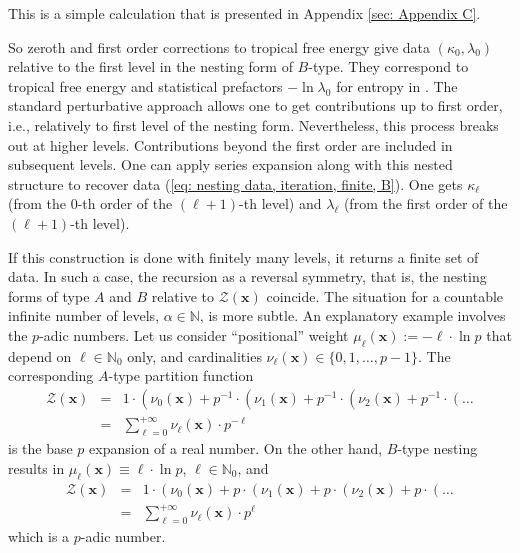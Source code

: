 \documentclass[11pt,british,reqno]{article}
\makeatletter
\numberwithin{equation}{section}
\numberwithin{figure}{section}
\numberwithin{table}{section}
\theoremstyle{definition}
\theoremstyle{definition}
\theoremstyle{plain}
\theoremstyle{plain}
\theoremstyle{remark}
\theoremstyle{plain}
\numberwithin{equation}{section}
\numberwithin{figure}{section}
\numberwithin{table}{section}
\theoremstyle{plain}
\renewenvironment{proof}[1][\proofname]{\par
  \pushQED{\qed}%
  \normalfont \topsep6\p@\@plus6\p@\relax
  \list{}{%
    \settowidth{\leftmargin}{\itshape\proofname:\hskip\labelsep}%
    \setlength{\labelwidth}{0pt}%
    \setlength{\itemindent}{-\leftmargin}%
  }%
  \item[\hskip\labelsep\itshape#1\@addpunct{:}]\ignorespaces
}{%
  \popQED\endlist\@endpefalse
}
\makeatother
\begin{document}
\begin{proof} This is a simple calculation that is presented in Appendix \ref{sec: Appendix C}. 
\end{proof}

So zeroth and first order corrections to tropical free energy give
data $(\kappa_{0},\lambda_{0})$ relative to the first level in the
nesting form of $B$-type. They correspond to tropical free energy
and statistical prefactors $-\ln\lambda_{0}$ for entropy in \cite{AK2015}.
The standard perturbative approach allows one to get contributions
up to first order, i.e., relatively to first level of the nesting form. Nevertheless,
this process breaks out at higher levels. Contributions beyond the
first order are included in subsequent levels. One can apply series
expansion along with this nested structure to recover data (\ref{eq: nesting data, iteration, finite, B}). One
gets $\kappa_{\ell}$ (from the $0$-th order of the $(\ell+1)$-th
level) and $\lambda_{\ell}$ (from the first order of the $(\ell+1)$-th
level). 

If this construction is done with finitely many levels, it returns
a finite set of data. In such a case, the recursion as a reversal
symmetry, that is, the nesting forms of type $A$ and $B$ relative
to $\mathcal{Z}(\boldsymbol{x})$ coincide. The situation for a countable
infinite number of levels, $\alpha\in\mathbb{N}$, is more subtle.
An explanatory example involves the $p$-adic numbers. Let us consider
``positional'' weight $\mu_{\ell}(\boldsymbol{x}):=-\ell\cdot\ln p$
that depend on $\ell\in\mathbb{N}_{0}$ only, and cardinalities $\nu_{\ell}(\boldsymbol{x})\in\{0,1,\dots,p-1\}$.
The corresponding $A$-type partition function 
\begin{eqnarray}
\mathcal{Z}(\boldsymbol{x}) & = & 1\cdot\left(\nu_{0}(\boldsymbol{x})+p^{-1}\cdot\left(\nu_{1}(\boldsymbol{x})+p^{-1}\cdot\left(\nu_{2}(\boldsymbol{x})+p^{-1}\cdot\left(\dots\right.\right.\right.\right. \nonumber \\
 & = & {\displaystyle \sum_{\ell=0}^{+\infty}\nu_{\ell}(\boldsymbol{x})\cdot p^{-\ell}}\label{eq: nested partition function, p-adic A} 
\end{eqnarray}
is the base $p$ expansion of a real number. On the other hand,
$B$-type nesting results in $\mu_{\ell}(\boldsymbol{x})\equiv\ell\cdot\ln p$,
$\ell\in\mathbb{N}_{0}$, and 
\begin{eqnarray}
\mathcal{Z}(\boldsymbol{x}) & = & 1\cdot\left(\nu_{0}(\boldsymbol{x})+p\cdot\left(\nu_{1}(\boldsymbol{x})+p\cdot\left(\nu_{2}(\boldsymbol{x})+p\cdot\left(\dots\right.\right.\right.\right. \nonumber \\
 & = & {\displaystyle \sum_{\ell=0}^{+\infty}\nu_{\ell}(\boldsymbol{x})\cdot p^{\ell}}\label{eq: nested partition function, p-adic B} 
\end{eqnarray}
which is a $p$-adic number. 
\end{document}
